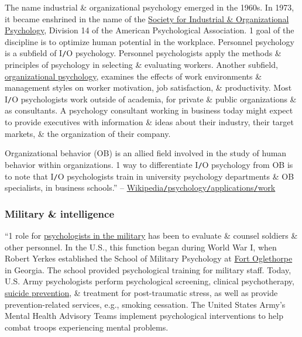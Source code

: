 \documentclass[oneside]{book}
\numberwithin{equation}{section}
\begin{document}
The name industrial \& organizational psychology emerged in the 1960s. In 1973, it became enshrined in the name of the \href{https://en.wikipedia.org/wiki/Society_for_Industrial_and_Organizational_Psychology}{Society for Industrial \& Organizational Psychology}, Division 14 of the American Psychological Association. 1 goal of the discipline is to optimize human potential in the workplace. Personnel psychology is a subfield of I\texttt{/}O psychology. Personnel psychologists apply the methods \& principles of psychology in selecting \& evaluating workers. Another subfield, \href{https://en.wikipedia.org/wiki/Organizational_psychology}{organizational psychology}, examines the effects of work environments \& management styles on worker motivation, job satisfaction, \& productivity. Most I\texttt{/}O psychologists work outside of academia, for private \& public organizations \& as consultants. A psychology consultant working in business today might expect to provide executives with information \& ideas about their industry, their target markets, \& the organization of their company.

Organizational behavior (OB) is an allied field involved in the study of human behavior within organizations. 1 way to differentiate I\texttt{/}O psychology from OB is to note that I\texttt{/}O psychologists train in university psychology departments \& OB specialists, in business schools.'' -- \href{https://en.wikipedia.org/wiki/Psychology#Work}{Wikipedia\texttt{/}psychology\texttt{/}applications\texttt{/}work}

\subsubsection{Military \& intelligence}
``1 role for \href{https://en.wikipedia.org/wiki/Military_psychology}{psychologists in the military} has been to evaluate \& counsel soldiers \& other personnel. In the U.S., this function began during World War I, when Robert Yerkes established the School of Military Psychology at \href{https://en.wikipedia.org/wiki/Fort_Oglethorpe,_Georgia}{Fort Oglethorpe} in Georgia. The school provided psychological training for military staff. Today, U.S. Army psychologists perform psychological screening, clinical psychotherapy, \href{https://en.wikipedia.org/wiki/Suicide_prevention}{suicide prevention}, \& treatment for post-traumatic stress, as well as provide prevention-related services, e.g., smoking cessation. The United States Army's Mental Health Advisory Teams implement psychological interventions to help combat troops experiencing mental problems.
\end{document}
